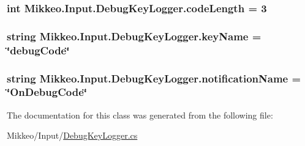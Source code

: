 \subsubsection[{\texorpdfstring{code\+Length}{codeLength}}]{\setlength{\rightskip}{0pt plus 5cm}int Mikkeo.\+Input.\+Debug\+Key\+Logger.\+code\+Length = 3}\hypertarget{class_mikkeo_1_1_input_1_1_debug_key_logger_a6a9f3b9dd9c00c95401470070c3dd737}{}\label{class_mikkeo_1_1_input_1_1_debug_key_logger_a6a9f3b9dd9c00c95401470070c3dd737}
\subsubsection[{\texorpdfstring{key\+Name}{keyName}}]{\setlength{\rightskip}{0pt plus 5cm}string Mikkeo.\+Input.\+Debug\+Key\+Logger.\+key\+Name = \char`\"{}debug\+Code\char`\"{}}\hypertarget{class_mikkeo_1_1_input_1_1_debug_key_logger_a844a94c2963305238a87b1fdde6087df}{}\label{class_mikkeo_1_1_input_1_1_debug_key_logger_a844a94c2963305238a87b1fdde6087df}
\subsubsection[{\texorpdfstring{notification\+Name}{notificationName}}]{\setlength{\rightskip}{0pt plus 5cm}string Mikkeo.\+Input.\+Debug\+Key\+Logger.\+notification\+Name = \char`\"{}On\+Debug\+Code\char`\"{}}\hypertarget{class_mikkeo_1_1_input_1_1_debug_key_logger_a5ce404ce35cc23f447a462ad9a7f4f3a}{}\label{class_mikkeo_1_1_input_1_1_debug_key_logger_a5ce404ce35cc23f447a462ad9a7f4f3a}


The documentation for this class was generated from the following file\+:\begin{DoxyCompactItemize}
\item 
Mikkeo/\+Input/\hyperlink{_debug_key_logger_8cs}{Debug\+Key\+Logger.\+cs}\end{DoxyCompactItemize}
